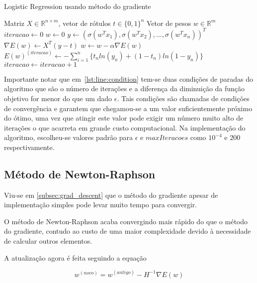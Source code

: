 \begin{algorithm}[H]
	\caption{Logistic Regression usando método do gradiente}
	\begin{algorithmic}[1]
		\REQUIRE Matriz $ X \in \mathbb{R}^{n \times m} $, 
		vetor de rótulos $t \in \{0, 1\}^n$
		\ENSURE Vetor de pesos $w \in \mathbb{R}^m$
		\STATE $iteracao \leftarrow 0$
		\STATE $w \leftarrow 0$
		 \label{lst:line:condition}
			\STATE $y \leftarrow (\sigma(w^Tx_1), \sigma(w^Tx_2), \ldots, \sigma(w^Tx_n))^T$ 
			\STATE $\nabla E(w) \leftarrow X^T(y - t)$ 
			\STATE $w \leftarrow w - \alpha \nabla E(w)$ 
			\STATE $E(w)^{ (iteracao) } \leftarrow 
			- \sum_{i = 1}^{n} \{ t_nln(y_n) + (1 - t_n) ln(1 - y_n) \}$ 
			\STATE $iteracao \leftarrow iteracao + 1$
		\ENDWHILE
	\end{algorithmic}
\end{algorithm}

Importante notar que em~\ref{lst:line:condition} tem-se duas condições de paradas do algoritmo que
são o número de iterações e a diferença da diminuição da função objetivo for menor do que
um dado $\epsilon$. Tais condições são chamadas de condições de convergência e garantem
que chegamou-se a um valor suficientemente próximo do ótimo, uma vez que atingir este valor
pode exigir um número muito alto de iterações o que acarreta em grande custo computacional.
 Na implementação do algoritmo, escolheu-se valores
padrão para $\epsilon$ e $maxIteracoes$ como $10^{-4}$ e $200$ respectivamente.


\subsection{Método de Newton-Raphson}
\label{subsec:newton-raphson}

Viu-se em \ref{subsec:grad_descent} que o método do gradiente apesar de implementação
simples pode levar muito tempo para convergir.

O método de Newton-Raphson acaba convergindo mais rápido do que o método do gradiente,
contudo ao custo de uma maior complexidade devido à necessidade de calcular outros
elementos.

A atualização agora é feita seguindo a equação

\begin{center}
	\begin{equation}\label{eq:newton-raphson}
		w^{ (novo) } = w^{ (antigo) } - H^{-1} \nabla E(w)
	\end{equation}
\end{center}


